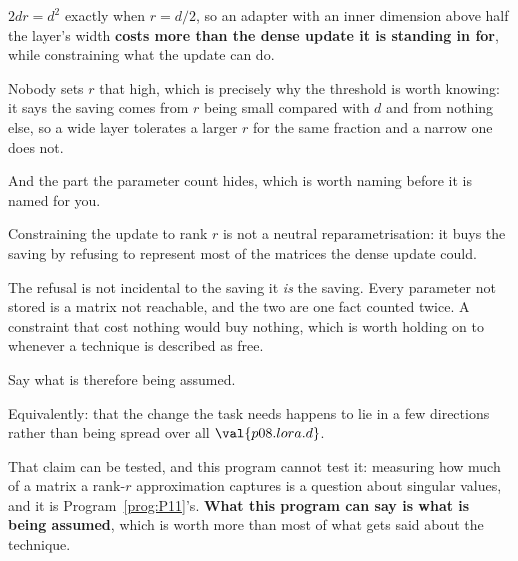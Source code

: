 \begin{fr}
$2dr = d^{2}$ exactly when $r = d/2$, so an adapter with an inner dimension
above half the layer's width \textbf{costs more than the dense update it is
standing in for}, while constraining what the update can do.

Nobody sets $r$ that high, which is precisely why the threshold is worth
knowing: it says the saving comes from $r$ being small compared with $d$ and
from nothing else, so a wide layer tolerates a larger $r$ for the same
fraction and a narrow one does not.
\end{fr}

\begin{fr}
And the part the parameter count hides, which is worth naming before it is
named for you.

Constraining the update to rank $r$ is not a neutral reparametrisation: it buys
the saving by refusing to represent most of the matrices the dense update
could.

The refusal is not incidental to the saving \dash{} it \emph{is} the saving.
Every parameter not stored is a matrix not reachable, and the two are one fact
counted twice. A constraint that cost nothing would buy nothing, which is worth
holding on to whenever a technique is described as free.

Say what is therefore being assumed.
\dotline
\nextframe
\end{fr}

\begin{fr}
Equivalently: that the change the task needs happens to lie in a few directions
rather than being spread over all $\val{p08.lora.d}$.

That claim can be tested, and this program cannot test it: measuring how much
of a matrix a rank-$r$ approximation captures is a question about singular
values, and it is Program~\ref{prog:P11}'s. \textbf{What this program can say
is what is being assumed}, which is worth more than most of what gets said
about the technique.
\end{fr}



